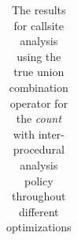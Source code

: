 \begin{table}[!htbp]
{\begin{tabular}{|c|c}
    	\end{tabular}
}


		\caption {The results for callsite analysis using the true union combination operator for the \textit{count} with inter-procedural analysis policy throughout different optimizations}
		\label{tbl:CStrueunionCOUNTinter}
\end{table}
%
%	
